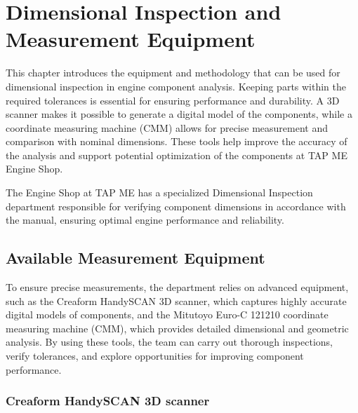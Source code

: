 
%

\chapter{Dimensional Inspection and Measurement Equipment}
\label{cha:lorem_ipsum}

This chapter introduces the equipment and methodology that can be used for dimensional inspection in engine component analysis. Keeping parts within the required tolerances is essential for ensuring performance and durability. A 3D scanner makes it possible to generate a digital model of the components, while a coordinate measuring machine (CMM) allows for precise measurement and comparison with nominal dimensions. These tools help improve the accuracy of the analysis and support potential optimization of the components at \gls{TAP} \gls{ME} Engine Shop.

The Engine Shop at \gls{TAP} \gls{ME} has a specialized Dimensional Inspection department responsible for verifying component dimensions in accordance with the manual, ensuring optimal engine performance and reliability.

\section{Available Measurement Equipment}
\label{sec:equipment}

To ensure precise measurements, the department relies on advanced equipment, such as the Creaform HandySCAN 3D scanner, which captures highly accurate digital models of components, and the Mitutoyo Euro-C 121210 coordinate measuring machine (CMM), which provides detailed dimensional and geometric analysis. By using these tools, the team can carry out thorough inspections, verify tolerances, and explore opportunities for improving component performance.

\subsection{Creaform HandySCAN 3D scanner}
\label{sec:scanner}

